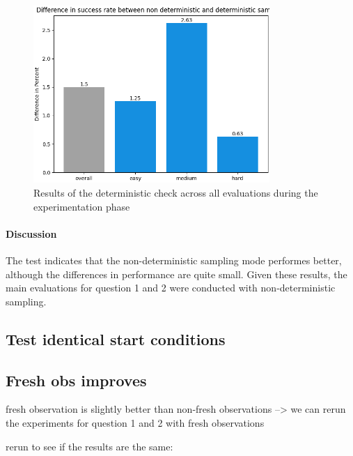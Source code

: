 \begin{figure}
    \centering
    \includegraphics[width=0.8\textwidth]{Bilder/notebook_images/deterministic_check_results.png}
    \caption{Results of the deterministic check across all evaluations during the experimentation phase}
    \label{fig:deterministic_check_result}
\end{figure}

\paragraph{Discussion}
The test indicates that the non-deterministic sampling mode performes better, although the differences in performance are quite small. Given these results, the main evaluations for question 1 and 2 were conducted with non-deterministic sampling.

\subsection{Test identical start conditions}




\subsection{Fresh obs improves}

fresh observation is slightly better than non-fresh observations
--> we can rerun the experiments for question 1 and 2 with fresh observations

rerun to see if the results are the same:


